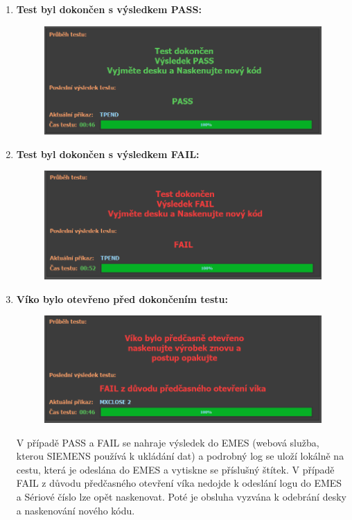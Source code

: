 \begin{enumerate}
	\item \textbf{Test byl dokončen s výsledkem PASS:}
	\begin{figure}[ht!]
		\centering
		\includegraphics[height = 0.2\textheight]{obrazky/PASS_EDITED.PNG}
	\end{figure}

	\item \textbf{Test byl dokončen s výsledkem FAIL:}
	\begin{figure}[ht!]
		\centering
		\includegraphics[height = 0.2\textheight]{obrazky/FAIL_EDITED.PNG}
	\end{figure}

	\item \textbf{Víko bylo otevřeno před dokončením testu:}
	\begin{figure}[ht!]
		\centering
		\includegraphics[height = 0.2\textheight]{obrazky/COVER_EDITED.PNG}
	\end{figure}

	V případě PASS a FAIL se nahraje výsledek do EMES (webová služba, kterou SIEMENS používá k ukládání dat)
    a podrobný log se uloží lokálně na cestu,
	která je odeslána do EMES a vytiskne se příslušný štítek.
	V případě FAIL z důvodu předčasného otevření víka nedojde k odeslání logu do EMES a Sériové číslo lze opět naskenovat.
	Poté je obsluha vyzvána k odebrání desky a naskenování nového kódu.

\end{enumerate}

